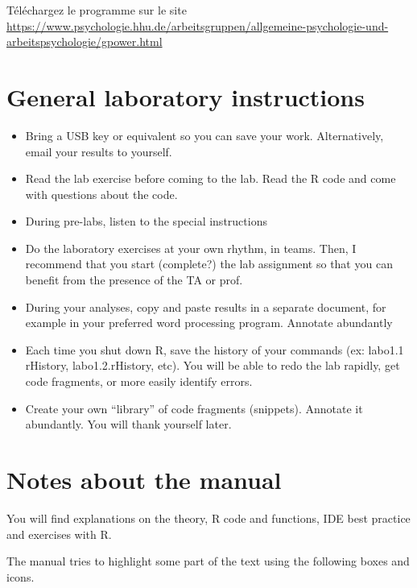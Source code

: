 \documentclass[
  12pt,
]{book}
\providecommand{\tightlist}{%
  \setlength{\itemsep}{0pt}\setlength{\parskip}{0pt}}
\begin{document}
Téléchargez le programme sur le site \url{https://www.psychologie.hhu.de/arbeitsgruppen/allgemeine-psychologie-und-arbeitspsychologie/gpower.html}

\hypertarget{general-laboratory-instructions}{%
\section*{General laboratory instructions}\label{general-laboratory-instructions}}

\begin{itemize}
\tightlist
\item
  Bring a USB key or equivalent so you can save your work. Alternatively, email your results to yourself.
\item
  Read the lab exercise before coming to the lab. Read the R code and come with questions about the code.
\item
  During pre-labs, listen to the special instructions
\item
  Do the laboratory exercises at your own rhythm, in teams. Then, I
  recommend that you start (complete?) the lab assignment so that you can benefit from the presence of the TA or prof.
\item
  During your analyses, copy and paste results in a separate document, for example in your preferred word processing program. Annotate abundantly
\item
  Each time you shut down R, save the history of your commands (ex: labo1.1 rHistory, labo1.2.rHistory, etc). You will be able to redo the lab rapidly, get code fragments, or more easily identify errors.
\item
  Create your own ``library'' of code fragments (snippets). Annotate
  it abundantly. You will thank yourself later.
\end{itemize}

\hypertarget{notes-about-the-manual}{%
\section*{Notes about the manual}\label{notes-about-the-manual}}

You will find explanations on the theory, R code and functions, IDE best practice and exercises with R.

The manual tries to highlight some part of the text using the following boxes and icons.
\end{document}
